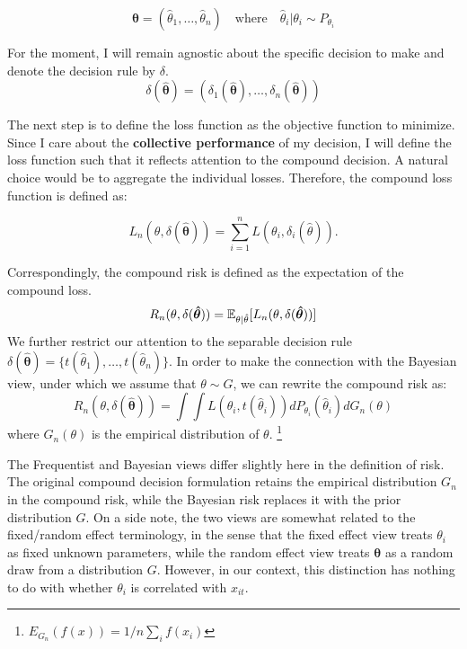 \documentclass[12pt]{article}
\begin{document}
\begin{equation*}
    \boldsymbol{\hat{\theta}}  =  (\hat{\theta}_1,\ldots, \hat{\theta}_n)\quad
    \text{where} \quad        \hat{\theta}_i | \theta_i \sim P_{\theta_i}
\end{equation*}

For the moment, I will remain agnostic about the specific decision to make and
denote the decision rule by \( \delta \).
\begin{equation*}
    \delta(\boldsymbol{\hat{\theta}}) = (\delta_1(\boldsymbol{\hat{\theta}}), \ldots, \delta_n(\boldsymbol{\hat{\theta}}))
\end{equation*}

The next step is to define the loss function as the objective function to
minimize. Since I care about the \textbf{collective performance} of my
decision, I will define the loss function such that it reflects attention to
the compound decision. A natural choice would be to aggregate the individual
losses. Therefore, the compound loss function is defined as:

\begin{equation*}
    L_n(\theta, \delta(\boldsymbol{\hat{\theta}})) = \sum_{i=1}^n L(\theta_i, \delta_i(\hat{\theta})).
\end{equation*}

Correspondingly, the compound risk is defined as the expectation of the
compound loss.
\begin{equation*}
    R_n(\theta, \delta(\boldsymbol{\hat{\theta}})) = \mathbb{E}_{\theta|\hat{\theta}}[L_n(\theta, \delta(\boldsymbol{\hat{\theta}}))]
\end{equation*}
We further restrict our attention to the separable decision rule \( \delta(\boldsymbol{\hat{\theta}}) = \{t(\hat{\theta}_1), \ldots, t(\hat{\theta}_n)\} \). In order to make the connection with the Bayesian view, under which we assume that \( \theta \sim G \), we can rewrite the compound risk as:
\begin{equation*}
    R_n(\theta, \delta(\boldsymbol{\hat{\theta}})) = \int \int L(\theta_i, t(\hat{\theta}_i))dP_{\theta_i}(\hat{\theta}_i)dG_n(\theta)
\end{equation*}
where $G_n(\theta)$ is the empirical distribution of $\theta$. \footnote{$E_{G_n}(f(x)) = 1/n \sum_i f(x_i)$}

The Frequentist and Bayesian views differ slightly here in the definition of
risk. The original compound decision formulation retains the empirical
distribution \( G_n \) in the compound risk, while the Bayesian risk replaces
it with the prior distribution \( G \). On a side note, the two views are
somewhat related to the fixed/random effect terminology, in the sense that the
fixed effect view treats \( \theta_i \) as fixed unknown parameters, while the
random effect view treats \( \boldsymbol{\theta} \) as a random draw from a
distribution \( G \). However, in our context, this distinction has nothing to
do with whether \( \theta_i \) is correlated with \( x_{it} \).
\end{document}
